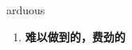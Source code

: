 
\begin{frame}
{\huge arduous}
\begin{center}
\begin{enumerate}\Large
  \item \textbf{难以做到的，费劲的}
\end{enumerate}
\end{center}
\end{frame}
